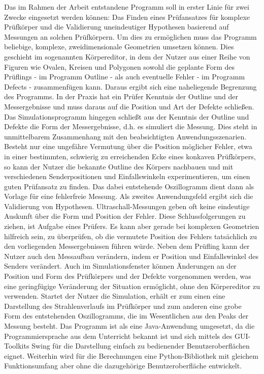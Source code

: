 \documentclass[reducespace,stylepage,semiarbeit]{spezidoc}
\begin{document}
Das im Rahmen der Arbeit entstandene Programm soll in erster Linie für zwei Zwecke eingesetzt werden können: Das Finden eines Prüfansatzes für komplexe Prüfkörper und die Validierung uneindeutiger Hypothesen basierend auf Messungen an solchen Prüfkörpern.
Um dies zu ermöglichen muss das Programm beliebige, komplexe, zweidimensionale Geometrien umsetzen können. 
Dies geschieht im sogenannten Körpereditor, in dem der Nutzer aus einer Reihe von Figuren wie Ovalen, Kreisen und Polygonen sowohl die geplante Form des Prüflings - im Programm Outline - als auch eventuelle Fehler - im Programm Defects - zusammenfügen kann.
Daraus ergibt sich eine naheliegende Begrenzung des Programms. 
In der Praxis hat ein Prüfer Kenntnis der Outline und der Messergebnisse und muss daraus auf die Position und Art der Defekte schließen. 
Das Simulationsprogramm hingegen schließt aus der Kenntnis der Outline und Defekte die Form der Messergebnisse, d.h. 
es simuliert die Messung. 
Dies steht in unmittelbarem Zusammenhang mit den beabsichtigten Anwendungsszenarien.
Besteht nur eine ungefähre Vermutung über die Position möglicher Fehler, etwa in einer bestimmten, schwierig zu erreichenden Ecke eines konkaven Prüfkörpers, %
so kann der Nutzer die bekannte Outline des Körpers nachbauen und mit verschiedenen Senderpositionen und Einfallswinkeln experimentieren, um einen guten Prüfansatz zu finden. 
Das dabei entstehende Oszillogramm dient dann als Vorlage für eine fehlerfreie Messung.
Als zweites Anwendungsfeld ergibt sich die Validierung von Hypothesen. 
Ultraschall-Messungen geben oft keine eindeutige Auskunft über die Form und Position der Fehler. 
Diese Schlussfolgerungen zu ziehen, ist Aufgabe eines Prüfers. 
Es kann aber gerade bei komplexen Geometrien hilfreich sein, zu überprüfen, ob die vermutete Position des Fehlers tatsächlich zu den vorliegenden Messergebnissen führen würde.
Neben dem Prüfling kann der Nutzer auch den Messaufbau verändern, indem er Position und Einfallswinkel des Senders verändert. 
Auch im Simulationsfenster können Änderungen an der Position und Form des Prüfkörpers und der Defekte vorgenommen werden, was eine geringfügige Veränderung der Situation ermöglicht, ohne den Körpereditor zu verwenden.
Startet der Nutzer die Simulation, erhält er zum einen eine Darstellung des Strahlenverlaufs im Prüfkörper und zum anderen eine grobe Form des entstehenden Oszillogramms, die im Wesentlichen aus den Peaks der Messung besteht.
Das Programm ist als eine Java-Anwendung umgesetzt, da die Programmiersprache aus dem Unterricht bekannt ist und sich mittels des GUI-Toolkits Swing für die Darstellung einfach zu bedienender Benutzeroberflächen eignet.
Weiterhin wird für die Berechnungen eine Python-Bibliothek mit gleichem Funktionsumfang aber ohne die dazugehörige Benutzeroberfläche entwickelt. %
\end{document}
